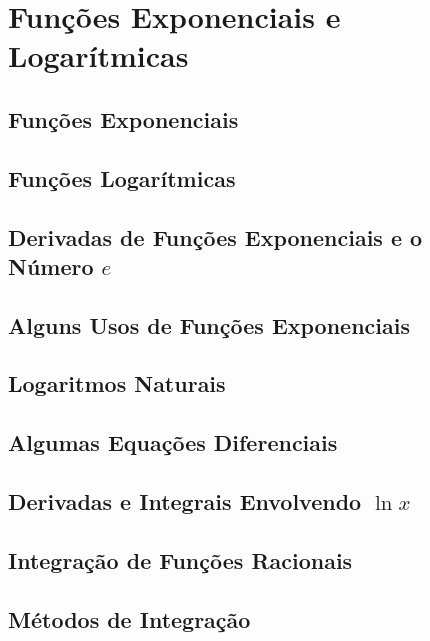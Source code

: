 \documentclass{svmono}
\begin{document}
\begin{chapterproblems}
\end{chapterproblems}

\chapter{Funções Exponenciais e Logarítmicas}
\label{chp:explog}

\section{Funções Exponenciais}
\label{sec:expfunc}

\section{Funções Logarítmicas}
\label{sec:logfunc}

\section{Derivadas de Funções Exponenciais e o Número $e$}
\label{sec:derivexp}

\section{Alguns Usos de Funções Exponenciais}
\label{sec:useexp}

\section{Logaritmos Naturais}
\label{sec:natlog}

\section{Algumas Equações Diferenciais}
\label{sec:diffeq}

\section{Derivadas e Integrais Envolvendo $\ln x$}
\label{sec:derivln}

\section{Integração de Funções Racionais}
\label{sec:intratfunc}

\section{Métodos de Integração}
\label{sec:methodint}
\end{document}
